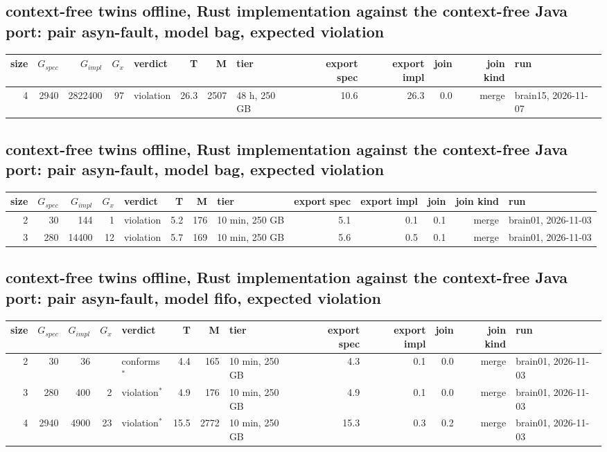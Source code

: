 \documentclass[10pt]{article}
\begin{document}
\subsection*{context-free twins offline, Rust implementation against the context-free Java port: pair \textsf{asyn-fault}, model bag, expected violation}
\begin{longtable}{@{}rrrrlrrlrrrrl@{}}
\toprule
size & $G_{\mathit{spec}}$ & $G_{\mathit{impl}}$ & $G_x$ & verdict & T & M & tier & export spec & export impl & join & join kind & run \\
\midrule
\endhead
\color{red} 4 & 2940 & 2822400 & 97 & violation & 26.3 & 2507 & 48 h, 250 GB & 10.6 & 26.3 & 0.0 & merge & brain15, 2026-11-07 \\
\bottomrule
\end{longtable}
\subsection*{context-free twins offline, Rust implementation against the context-free Java port: pair \textsf{asyn-fault}, model bag, expected violation}
\begin{longtable}{@{}rrrrlrrlrrrrl@{}}
\toprule
size & $G_{\mathit{spec}}$ & $G_{\mathit{impl}}$ & $G_x$ & verdict & T & M & tier & export spec & export impl & join & join kind & run \\
\midrule
\endhead
\color{blue} 2 & 30 & 144 & 1 & violation & 5.2 & 176 & 10 min, 250 GB & 5.1 & 0.1 & 0.1 & merge & brain01, 2026-11-03 \\
\color{blue} 3 & 280 & 14400 & 12 & violation & 5.7 & 169 & 10 min, 250 GB & 5.6 & 0.5 & 0.1 & merge & brain01, 2026-11-03 \\
\bottomrule
\end{longtable}
\subsection*{context-free twins offline, Rust implementation against the context-free Java port: pair \textsf{asyn-fault}, model fifo, expected violation}
\begin{longtable}{@{}rrrrlrrlrrrrl@{}}
\toprule
size & $G_{\mathit{spec}}$ & $G_{\mathit{impl}}$ & $G_x$ & verdict & T & M & tier & export spec & export impl & join & join kind & run \\
\midrule
\endhead
\color{blue} 2 & 30 & 36 &  & conforms$^{\ast}$ & 4.4 & 165 & 10 min, 250 GB & 4.3 & 0.1 & 0.0 & merge & brain01, 2026-11-03 \\
\color{blue} 3 & 280 & 400 & 2 & violation$^{\ast}$ & 4.9 & 176 & 10 min, 250 GB & 4.9 & 0.1 & 0.0 & merge & brain01, 2026-11-03 \\
\color{blue} 4 & 2940 & 4900 & 23 & violation$^{\ast}$ & 15.5 & 2772 & 10 min, 250 GB & 15.3 & 0.3 & 0.2 & merge & brain01, 2026-11-03 \\
\bottomrule
\end{longtable}
\end{document}
